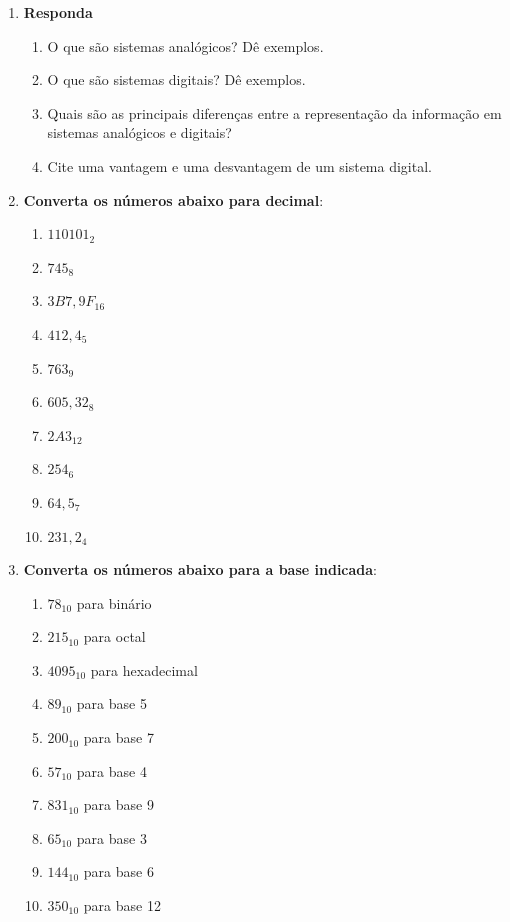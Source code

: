 
\begin{enumerate}

    \item \textbf{Responda}


          \begin{enumerate}
              \item O que são sistemas analógicos? Dê exemplos.
              \item O que são sistemas digitais? Dê exemplos.
              \item Quais são as principais diferenças entre a representação da informação em sistemas analógicos e digitais?
              \item Cite uma vantagem e uma desvantagem de um sistema digital.
          \end{enumerate}




    \item \textbf{Converta os números abaixo para decimal}:
          \begin{enumerate}
              \item  $110101_2$
              \item  $745_8$
              \item  $3B7,9F_{16}$
              \item  $412,4_5$
              \item  $763_9$
              \item  $605,32_8$
              \item  $2A3_{12}$
              \item  $254_6$
              \item  $64,5_7$
              \item  $231,2_4$
          \end{enumerate}

    \item \textbf{Converta os números abaixo para a base indicada}:
          \begin{enumerate}
              \item  $78_{10}$ para binário
              \item  $215_{10}$ para octal
              \item  $4095_{10}$ para hexadecimal
              \item  $89_{10}$ para base 5
              \item  $200_{10}$ para base 7
              \item  $57_{10}$ para base 4
              \item  $831_{10}$ para base 9
              \item  $65_{10}$ para base 3
              \item  $144_{10}$ para base 6
              \item  $350_{10}$ para base 12
          \end{enumerate}


\end{enumerate}
